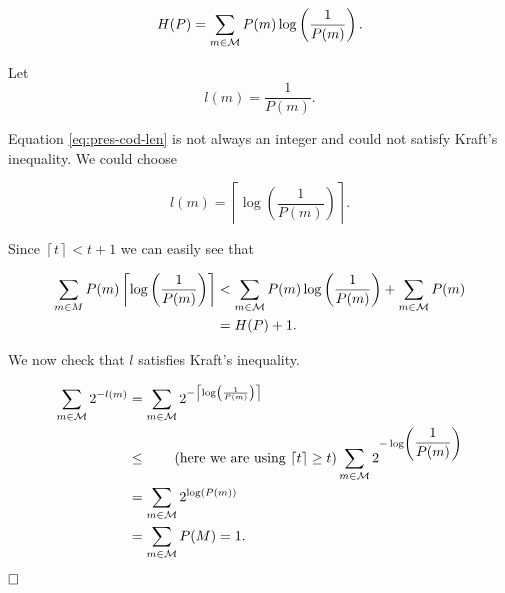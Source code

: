 \[
 H(P) = \sum_{m \in \mathcal{M}} P(m)\log\left(\dfrac{1}{P(m)}\right).
\]

Let
\begin{equation}\label{eq:pres-cod-len}
l(m) = \dfrac{1}{P(m)}. 
\end{equation}

Equation \ref{eq:pres-cod-len} is not always an integer and could not satisfy Kraft's inequality. We could choose

\begin{equation}
l(m) = \left\lceil\log\left(\dfrac{1}{P(m)}\right)\right\rceil.
\end{equation}


Since $\left\lceil t \right\rceil < t + 1$ we can easily see that 

\begin{align*}
\sum_{m \in M} P(m)\left\lceil\log\left(\dfrac{1}{P(m)}\right)\right\rceil & < \sum_{m \in \mathcal{M}} P(m)\log\left(\dfrac{1}{P(m)}\right) + \sum_{m \in \mathcal{M}} P(m)\\ & =  H(P) + 1. 
\end{align*}


We now check that $l$ satisfies Kraft's inequality.

\begin{align*}
\sum_{m \in \mathcal{M}} 2^{-l(m)} & = \sum_{m \in \mathcal{M}} 2^{-\left\lceil\log\left(\frac{1}{P(m)}\right)\right\rceil}\\ 
& \leq\tag{here we are using $\left\lceil t \right\rceil \geq t$}
 \sum_{m \in \mathcal{M}} 2^{-\log\left(\dfrac{1}{P(m)}\right)} \\ 
& = \sum_{m \in \mathcal{M}} 2^{\log(P(m))} \\
& = \sum_{m \in \mathcal{M}} P(M) = 1.
\end{align*}

$\hfill\Box$